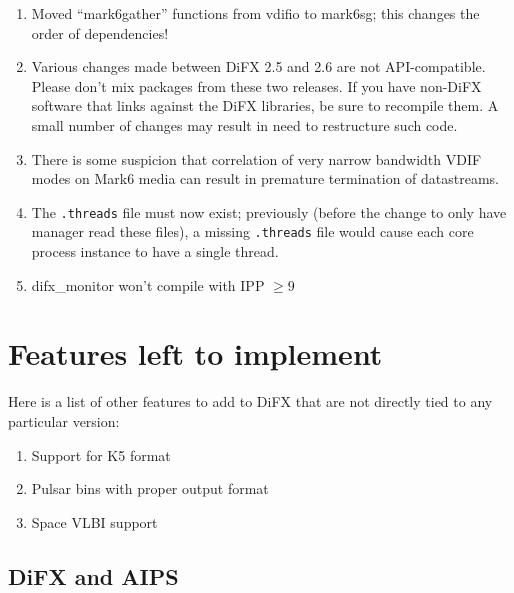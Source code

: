 \begin{enumerate}
\item Moved “mark6gather” functions from vdifio to mark6sg; this changes the order of dependencies!
\item Various changes made between DiFX 2.5 and 2.6 are not API-compatible. Please don't mix packages from these two releases. If you have non-DiFX software that links against the DiFX libraries, be sure to recompile them. A small number of changes may result in need to restructure such code.
\item There is some suspicion that correlation of very narrow bandwidth VDIF modes on Mark6 media can result in premature termination of datastreams.
\item The {\tt .threads} file must now exist; previously (before the change to only have manager read these files), a missing {\tt .threads} file would cause each core process instance to have a single thread.
\item difx\_monitor won't compile with IPP $\ge 9$
\end{enumerate}


\section{Features left to implement}

Here is a list of other features to add to DiFX that are not directly tied to any particular version:
\begin{enumerate}
\item Support for K5 format
\item Pulsar bins with proper output format
\item Space VLBI support
\end{enumerate}



\subsection{DiFX and AIPS}

